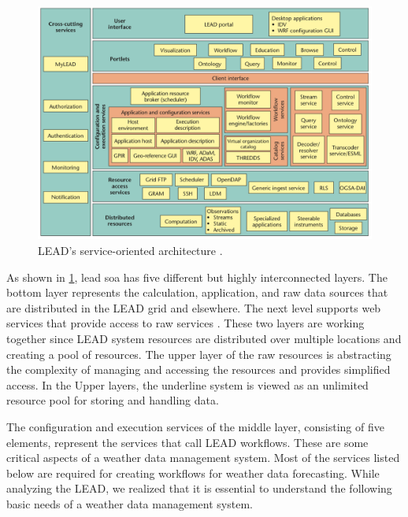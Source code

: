 \begin{figure}[htp]
    \centering
    \includegraphics[width=1\textwidth]{lit/lead/LEADs-service-oriented-architecture-A-wide-variety-of-services-and-resources-grouped_W640.png}
    \caption[LEAD's service-oriented architecture]{LEAD's service-oriented architecture \cite{Droegemeier2005Service-OrientedWeather}.}
    \label{fi:lead_soa}
\end{figure}

As shown in \cref{fi:lead_soa}, \acrshort{lead} \acrshort{soa} has five different but highly interconnected layers. The bottom layer represents the calculation, application, and raw data sources that are distributed in the LEAD grid and elsewhere. The next level supports web services that provide access to raw services \cite{Droegemeier2005Service-OrientedWeather}. These two layers are working together since LEAD system resources are distributed over multiple locations and creating a pool of resources. The upper layer of the raw resources is abstracting the complexity of managing and accessing the resources and provides simplified access. In the Upper layers, the underline system is viewed as an unlimited resource pool for storing and handling data.

The configuration and execution services of the middle layer, consisting of five elements, represent the services that call LEAD workflows. These are some critical aspects of a weather data management system. Most of the services listed below are required for creating workflows for weather data forecasting. While analyzing the LEAD, we realized that it is essential to understand the following basic needs of a weather data management system.

